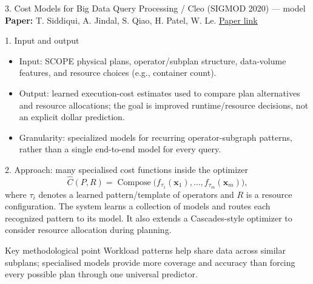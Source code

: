 \documentclass[aspectratio=169,10pt]{beamer}
\newcommand{\paperlink}[2]{\href{#1}{\textcolor{WayangTeal}{\underline{#2}}}}
\begin{document}
\begin{frame}[shrink=10]{3. Cost Models for Big Data Query Processing / Cleo (SIGMOD 2020) — model}
\small
\textbf{Paper:} T. Siddiqui, A. Jindal, S. Qiao, H. Patel, W. Le.
\hfill\paperlink{https://doi.org/10.1145/3318464.3380584}{Paper link}

\begin{block}{1. Input and output}
\begin{itemize}\setlength\itemsep{1pt}
  \item Input: SCOPE physical plans, operator/subplan structure, data-volume features, and resource choices (e.g., container count).
  \item Output: learned execution-cost estimates used to compare plan alternatives and resource allocations; the goal is improved runtime/resource decisions, not an explicit dollar prediction.
  \item Granularity: specialized models for recurring operator-subgraph patterns, rather than a single end-to-end model for every query.
\end{itemize}
\end{block}

\begin{block}{2. Approach: many specialised cost functions inside the optimizer}
\[
  \widehat C(P,R)=\operatorname{Compose}\bigl(f_{\tau_1}(\mathbf x_1),\ldots,f_{\tau_m}(\mathbf x_m)\bigr),
\]
where $\tau_i$ denotes a learned pattern/template of operators and $R$ is a resource configuration. The system learns a collection of models and routes each recognized pattern to its model. It also extends a Cascades-style optimizer to consider resource allocation during planning.
\end{block}
\begin{block}{Key methodological point}
Workload patterns help share data across similar subplans; specialised models provide more coverage and accuracy than forcing every possible plan through one universal predictor.
\end{block}
\end{frame}
\end{document}
